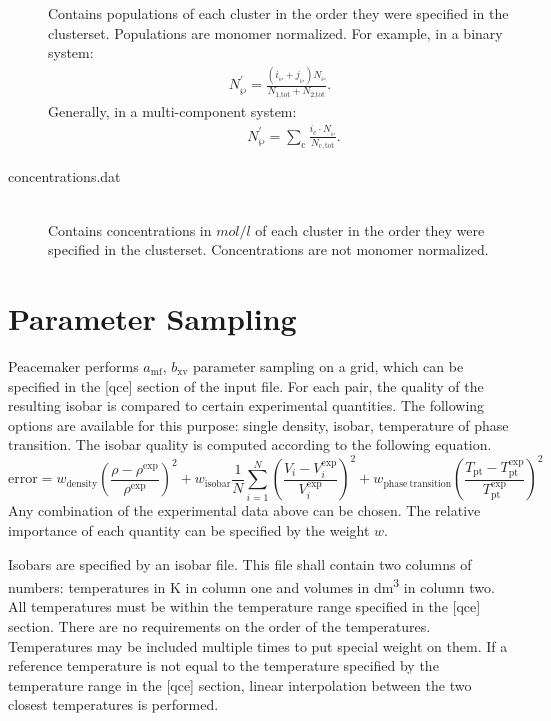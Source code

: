 \documentclass{scrartcl}
\newcommand{\amf}{a_\mathrm{mf}}
\newcommand{\bxv}{b_\mathrm{xv}}
\begin{document}
\begin{description}
        Contains populations of each cluster in the order they were specified in the clusterset.
        Populations are monomer normalized.
        For example, in a binary system:
        \begin{align}
        N^\prime_\wp = \frac{\left(i_\wp+j_\wp\right)N_\wp}{N_\text{1,tot} + N_\text{2,tot}}.
        \end{align}
        Generally, in a multi-component system:
        \begin{align}
        \qquad N^\prime_\wp = \sum_\mathrm{c} \frac{i_\mathrm{c} \cdot N_\wp}{N_\mathrm{c,tot}}.
        \end{align}
        \vspace{0.1cm}
    \item[concentrations.dat] \hfill \\
        Contains concentrations in $\si{mol/l}$ of each cluster in the order they were specified in the clusterset.
        Concentrations are not monomer normalized.
\end{description}

\section{Parameter Sampling}
\label{sec:sampling}

Peacemaker performs $\amf$, $\bxv$ parameter sampling on a grid, which can be specified in the [qce] 
section of the input file.
For each pair, the quality of the resulting isobar is compared to certain experimental quantities.
The following options are available for this purpose: single density, isobar, temperature of phase transition.
The isobar quality is computed according to the following equation.
\begin{equation*}
    \mathrm{error} = w_\mathrm{density}                                      {\left(\frac{\rho - \rho^\mathrm{exp}}{\rho^\mathrm{exp}}\right)}^2
                   + w_\mathrm{isobar}            \frac{1}{N} \sum_{i=1}^{N} {\left(\frac{V_i - V_i^\mathrm{exp}}{V_i^\mathrm{exp}}\right)}^2
                   + w_\mathrm{phase\ transition}                            {\left(\frac{T_\mathrm{pt}-T_\mathrm{pt}^\mathrm{exp}}{T_\mathrm{pt}^\mathrm{exp}}\right)}^2
\end{equation*}
Any combination of the experimental data above can be chosen.
The relative importance of each quantity can be specified by the weight $w$.

Isobars are specified by an isobar file.
This file shall contain two columns of numbers: temperatures in \si{K} in column one and volumes in 
\si{\cubic\deci\meter} in column two.
All temperatures must be within the temperature range specified in the [qce] section.
There are no requirements on the order of the temperatures.
Temperatures may be included multiple times to put special weight on them.
If a reference temperature is not equal to the temperature specified by the temperature range in the 
[qce] section, linear interpolation between the two closest temperatures is performed.
\end{document}
